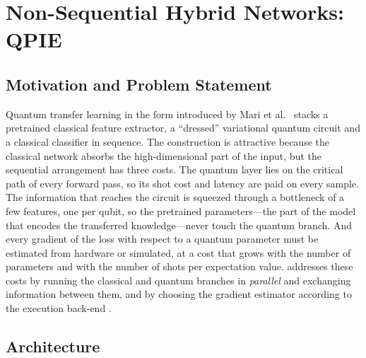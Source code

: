 \section{Non-Sequential Hybrid Networks: QPIE}\label{sec:qml:qpie}

\subsection{Motivation and Problem Statement}\label{sec:qml:qpie:motivation}

Quantum transfer learning in the form introduced by Mari et al.~\cite{mari2020transferlearning} stacks a pretrained classical feature extractor, a ``dressed'' variational quantum circuit and a classical classifier in sequence. The construction is attractive because the classical network absorbs the high-dimensional part of the input, but the sequential arrangement has three costs. The quantum layer lies on the critical path of every forward pass, so its shot cost and latency are paid on every sample. The information that reaches the circuit is squeezed through a bottleneck of a few features, one per qubit, so the pretrained parameters---the part of the model that encodes the transferred knowledge---never touch the quantum branch. And every gradient of the loss with respect to a quantum parameter must be estimated from hardware or simulated, at a cost that grows with the number of parameters and with the number of shots per expectation value. \qpie{} addresses these costs by running the classical and quantum branches in \emph{parallel} and exchanging information between them, and by choosing the gradient estimator according to the execution back-end \cite{guo2025qpie}.

\subsection{Architecture}\label{sec:qml:qpie:arch}

